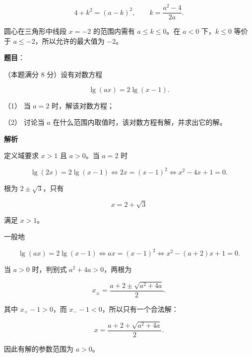 \begin{answer}
\nopagebreak[4]
\[
4+k^2=(a-k)^2,
\qquad
k=\frac{a^2-4}{2a}.
\]

圆心在三角形中线段 $x=-2$ 的范围内需有 $a\le k\le0$。在 $a<0$ 下，$k\le0$ 等价于 $a\le-2$，所以允许的最大值为 $-2$。





\gkanswer{答案（5）：$[-2,-1)$}






\end{answer}
\begin{answer}

\textbf{题目}：

（本题满分 8 分）设有对数方程

\nopagebreak[4]
\[
\lg(ax)=2\lg(x-1).
\]

（1） 当 $a=2$ 时，解该对数方程；

（2） 讨论当 $a$ 在什么范围内取值时，该对数方程有解，并求出它的解。

\textbf{解析}


定义域要求 $x>1$ 且 $a>0$。当 $a=2$ 时

\nopagebreak[4]
\[
\lg(2x)=2\lg(x-1)
\Longleftrightarrow
2x=(x-1)^2
\Longleftrightarrow
x^2-4x+1=0.
\]

根为 $2\pm\sqrt3$，只有

\nopagebreak[4]
\[
x=2+\sqrt3
\]

满足 $x>1$。


一般地

\nopagebreak[4]
\[
\lg(ax)=2\lg(x-1)
\Longleftrightarrow
ax=(x-1)^2
\Longleftrightarrow
x^2-(a+2)x+1=0.
\]

当 $a>0$ 时，判别式 $a^2+4a>0$，两根为

\nopagebreak[4]
\[
x_\pm=\frac{a+2\pm\sqrt{a^2+4a}}2.
\]

其中 $x_+-1>0$，而 $x_--1<0$，所以只有一个合法解：

\nopagebreak[4]
\[
x=\frac{a+2+\sqrt{a^2+4a}}2.
\]

因此有解的参数范围为 $a>0$。



\end{answer}

